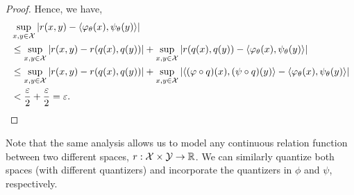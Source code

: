 \begin{proof}
Hence, we have,
\begin{equation*}
    \begin{split}
        &\sup_{x, y \in \calX} \abs{r(x, y) - \iprod{\phi_\theta(x)}{\psi_\theta(y)}} \\
        &\leq \sup_{x, y \in \calX} \abs{r(x, y) - r(q(x), q(y))} + \sup_{x, y \in \calX} \abs{r(q(x), q(y)) - \iprod{\phi_\theta(x)}{\psi_\theta(y)}} \\
        &\leq  \sup_{x, y \in \calX} \abs{r(x, y) - r(q(x), q(y))} + \sup_{x, y \in \calX} \abs{\iprod{(\phi \circ q)(x)}{(\psi \circ q)(y)} - \iprod{\phi_\theta(x)}{\psi_\theta(y)}}  \\
        &< \frac{\varepsilon}{2} + \frac{\varepsilon}{2} = \varepsilon.
    \end{split}
\end{equation*}

\end{proof}

\begin{remark}
    Note that the same analysis allows us to model any continuous relation function between two different spaces, $r: {\mathcal{X}} \times {\mathcal{Y}} \to \mathbb{R}$. We can similarly quantize both spaces (with different quantizers) and incorporate the quantizers in $\phi$ and $\psi$, respectively.
\end{remark}
